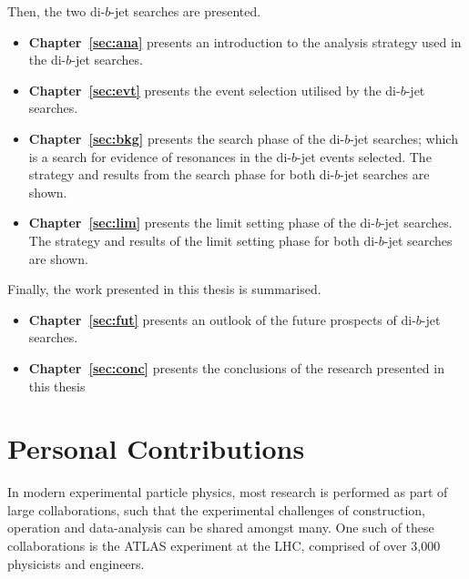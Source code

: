 \noindent
Then, the two di-$b$-jet searches are presented. %
\vspace{-0.5em}
\begin{itemize}[leftmargin=*]
\item\textbf{Chapter~\ref{sec:ana}} presents an introduction to the analysis strategy used in the \mbox{di-$b$-jet} searches.
\item\textbf{Chapter~\ref{sec:evt}} presents the event selection utilised by the \mbox{di-$b$-jet} searches.
\item\textbf{Chapter~\ref{sec:bkg}} presents the search phase of the di-$b$-jet searches;
  which is a search for evidence of resonances in the di-$b$-jet events selected.
  The strategy and results from the search phase for both di-$b$-jet searches are shown.%
\item\textbf{Chapter~\ref{sec:lim}} presents the limit setting phase of the di-$b$-jet searches.
  The strategy and results of the limit setting phase for both di-$b$-jet searches are shown.%
\end{itemize}

\noindent
Finally, the work presented in this thesis is summarised.
\vspace{-0.5em}
  \begin{itemize}[leftmargin=*]
\item\textbf{Chapter~\ref{sec:fut}} presents an outlook of the future prospects of di-$b$-jet searches.%
\item\textbf{Chapter~\ref{sec:conc}} presents the conclusions of the research presented in this thesis%
\end{itemize}
\clearpage
\section{Personal Contributions}

\vspace{-0.5em}
In modern experimental particle physics, most research is performed as part of large collaborations,
such that the experimental challenges of construction, operation and data-analysis can be shared amongst many.
One such of these collaborations is the ATLAS experiment at the LHC, comprised of over 3,000 physicists and engineers.

